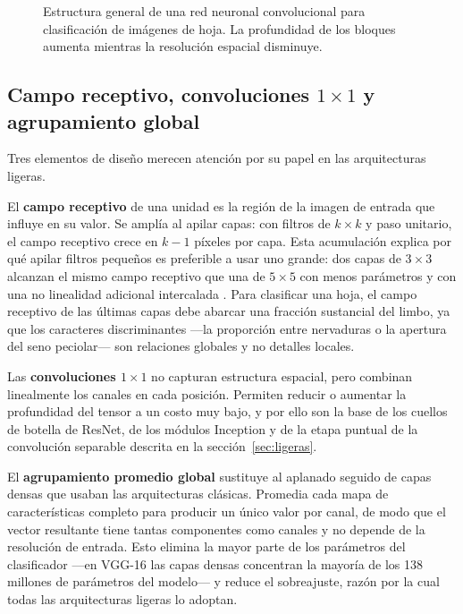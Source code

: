 \begin{figure}[htbp]
\caption{Estructura general de una red neuronal convolucional para
clasificación de imágenes de hoja. La profundidad de los bloques aumenta
mientras la resolución espacial disminuye.}
\label{fig:cnn}
\end{figure}

\subsection{Campo receptivo, convoluciones $1\times1$ y agrupamiento global}

Tres elementos de diseño merecen atención por su papel en las
arquitecturas ligeras.

El \textbf{campo receptivo} de una unidad es la región de la imagen de
entrada que influye en su valor. Se amplía al apilar capas: con filtros de
$k \times k$ y paso unitario, el campo receptivo crece en $k-1$ píxeles por
capa. Esta acumulación explica por qué apilar filtros pequeños es preferible
a usar uno grande: dos capas de $3\times3$ alcanzan el mismo campo receptivo
que una de $5\times5$ con menos parámetros y con una no linealidad adicional
intercalada \citep{simonyan2015}. Para clasificar una hoja, el campo
receptivo de las últimas capas debe abarcar una fracción sustancial del
limbo, ya que los caracteres discriminantes —la proporción entre nervaduras
o la apertura del seno peciolar— son relaciones globales y no detalles
locales.

Las \textbf{convoluciones $1\times1$} no capturan estructura espacial, pero
combinan linealmente los canales en cada posición. Permiten reducir o
aumentar la profundidad del tensor a un costo muy bajo, y por ello son la
base de los cuellos de botella de ResNet, de los módulos Inception y de la
etapa puntual de la convolución separable descrita en la
sección~\ref{sec:ligeras}.

El \textbf{agrupamiento promedio global} sustituye al aplanado seguido de
capas densas que usaban las arquitecturas clásicas. Promedia cada mapa de
características completo para producir un único valor por canal, de modo que
el vector resultante tiene tantas componentes como canales y no depende de
la resolución de entrada. Esto elimina la mayor parte de los parámetros del
clasificador —en VGG-16 las capas densas concentran la mayoría de los 138
millones de parámetros del modelo— y reduce el sobreajuste, razón por la
cual todas las arquitecturas ligeras lo adoptan.

